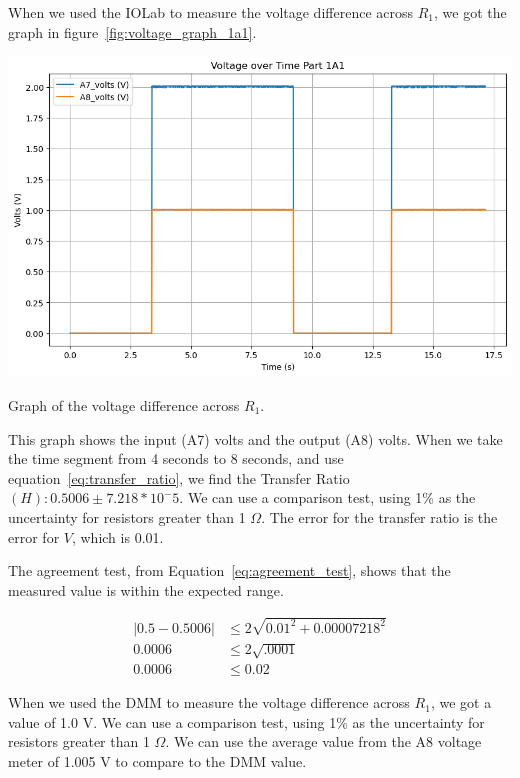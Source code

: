 \documentclass[11pt]{article}
\begin{document}
    When we used the IOLab to measure the voltage difference across $R_1$, we got the graph in figure~\ref{fig:voltage_graph_1a1}.
    \begin{f}[h!]
        \begin{center}
            \includegraphics[width=1.0\linewidth]{resources/images/part1a1_voltage_over_time}
        \end{center}
        \caption{Graph of the voltage difference across $R_1$.}
        \label{fig:voltage_graph_1a1}
    \end{f}

    This graph shows the input (A7) volts and the output (A8) volts.
    When we take the time segment from 4 seconds to 8 seconds, and use equation~\ref{eq:transfer_ratio}, we find the Transfer Ratio $(H): 0.5006 \pm 7.218 * 10^-5$.
    We can use a comparison test, using 1\% as the uncertainty for resistors greater than 1 $\Omega$.
    The error for the transfer ratio is the error for $V$, which is 0.01.
    
    The agreement test, from Equation~\ref{eq:agreement_test}, shows that the measured value is within the expected range.
    \begin{e}
        \begin{align*}
            |0.5 - 0.5006| &\le 2 \sqrt{0.01^2 + 0.00007218^2} \\
            0.0006 &\le 2 \sqrt{.0001} \\
            0.0006 &\le 0.02
        \end{align*}
    \end{e}

    When we used the DMM to measure the voltage difference across $R_1$, we got a value of 1.0 V. We can use a
    comparison test, using 1\% as the uncertainty for resistors greater than 1 $\Omega$.
    We can use the average value from the A8 voltage meter of 1.005 V to compare to the DMM value.
    
\end{document}
